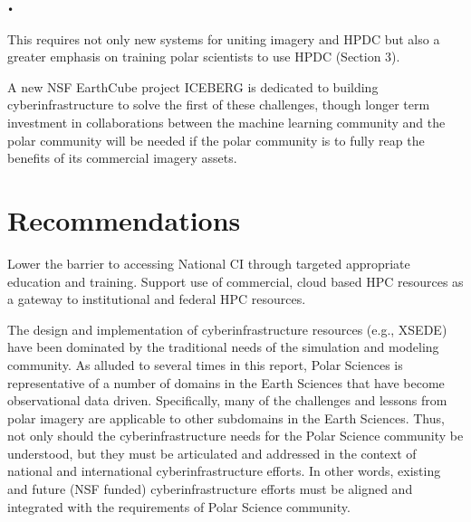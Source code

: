 \texttt{•}\documentclass[10pt,letterpaper,draft]{article}
\begin{document}
This requires not only new systems for uniting imagery and HPDC but also a greater emphasis on training polar scientists to use HPDC (Section 3). 

A new NSF EarthCube project ICEBERG is dedicated to building
cyberinfrastructure to solve the first of these challenges, though longer term
investment in collaborations between the machine learning community and the
polar community will be needed if the polar community is to fully reap the
benefits of its commercial imagery assets.

\section{Recommendations}

\begin{description}[style=unboxed]
  \item[1. Lowering the barrier to access to National CI:]
  Lower the barrier to accessing National CI through targeted appropriate education and training.
Support use of commercial, cloud based HPC resources as a gateway to institutional and federal HPC resources.

\item[2. Representing the needs of Earth Science in the design and analysis of National CI:]
The design and implementation of cyberinfrastructure resources (e.g., XSEDE) have been dominated by the traditional needs of the simulation and modeling community. As alluded to several times in this report, Polar Sciences is representative of a number of domains in the Earth Sciences that have become observational data driven. Specifically, many of the challenges and lessons from polar imagery are applicable to other subdomains in the Earth Sciences. Thus, not only should the cyberinfrastructure needs for the Polar Science community be understood, but they must be articulated and addressed in the context of national and international cyberinfrastructure efforts. In other words, existing and future (NSF funded) cyberinfrastructure efforts must be aligned and integrated with the requirements of Polar Science community.


\end{description}
\end{document}
